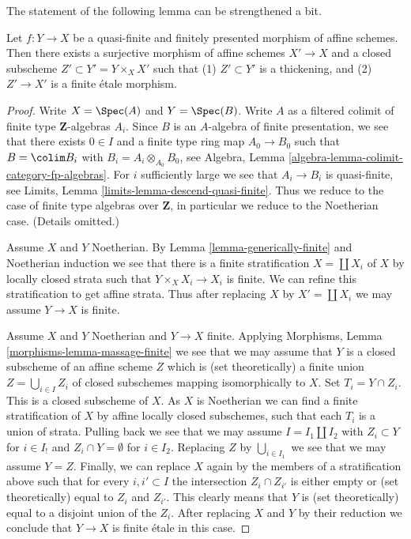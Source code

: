 \noindent
The statement of the following lemma can be strengthened a bit.

\begin{lemma}
\label{lemma-decompose-quasi-finite-morphism}
Let $f : Y \to X$ be a quasi-finite and finitely presented
morphism of affine schemes. Then there exists a surjective morphism
of affine schemes $X' \to X$ and a closed subscheme
$Z' \subset Y' = Y \times_X X'$ such that (1) $Z' \subset Y'$
is a thickening, and (2) $Z' \to X'$ is a finite \'etale morphism.
\end{lemma}

\begin{proof}
Write $X = \Spec(A)$ and $Y = \Spec(B)$. Write $A$ as a filtered colimit
of finite type $\mathbf{Z}$-algebras $A_i$. Since $B$ is an $A$-algebra of
finite presentation, we see that there exists $0 \in I$ and a
finite type ring map $A_0 \to B_0$ such that $B = \colim B_i$ with
$B_i = A_i \otimes_{A_0} B_0$, see
Algebra, Lemma \ref{algebra-lemma-colimit-category-fp-algebras}.
For $i$ sufficiently large we see that $A_i \to B_i$ is
quasi-finite, see Limits, Lemma \ref{limits-lemma-descend-quasi-finite}.
Thus we reduce to the case of finite type algebras over $\mathbf{Z}$,
in particular we reduce to the Noetherian case. (Details omitted.)

\medskip\noindent
Assume $X$ and $Y$ Noetherian.
By Lemma \ref{lemma-generically-finite}
and Noetherian induction we see that
there is a finite stratification $X = \coprod X_i$ of $X$
by locally closed strata such that $Y \times_X X_i \to X_i$ is finite.
We can refine this stratification to get affine strata.
Thus after replacing $X$ by $X' = \coprod X_i$ we may assume
$Y \to X$ is finite.

\medskip\noindent
Assume $X$ and $Y$ Noetherian and $Y \to X$ finite.
Applying Morphisms, Lemma \ref{morphisms-lemma-massage-finite}
we see that we may assume that $Y$ is a closed subscheme of an
affine scheme $Z$ which is (set theoretically) a finite union
$Z = \bigcup_{i \in I} Z_i$ of
closed subschemes mapping isomorphically to $X$.
Set $T_i = Y \cap Z_i$. This is a closed subscheme of $X$.
As $X$ is Noetherian we can find a finite stratification of $X$
by affine locally closed subschemes, such that each
$T_i$ is a union of strata. Pulling back we see that
we may assume $I = I_1 \amalg I_2$ with $Z_i \subset Y$ for
$i \in I_!$ and $Z_i \cap Y = \emptyset$ for $i \in I_2$.
Replacing $Z$ by $\bigcup_{i \in I_1}$ we see that we may assume $Y = Z$.
Finally, we can replace $X$ again by the members of a stratification
above such that for every $i, i' \subset I$ the intersection
$Z_i \cap Z_{i'}$ is either empty or (set theoretically) equal
to $Z_i$ and $Z_{i'}$. This clearly means that $Y$ is (set theoretically)
equal to a disjoint union of the $Z_i$. After replacing $X$ and
$Y$ by their reduction we conclude that $Y \to X$ is finite
\'etale in this case.
\end{proof}









